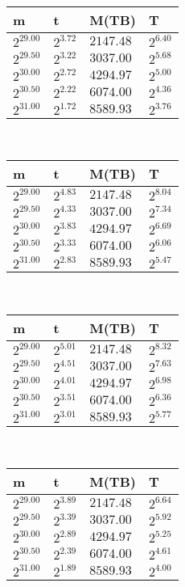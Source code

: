  \ 
\begin{tabular}{llll}
m & t & M(TB) & T \\ \hline
$2^{29.00}$ & $2^{3.72}$ & $2147.48$ & $2^{6.40}$ \\
$2^{29.50}$ & $2^{3.22}$ & $3037.00$ & $2^{5.68}$ \\
$2^{30.00}$ & $2^{2.72}$ & $4294.97$ & $2^{5.00}$ \\
$2^{30.50}$ & $2^{2.22}$ & $6074.00$ & $2^{4.36}$ \\
$2^{31.00}$ & $2^{1.72}$ & $8589.93$ & $2^{3.76}$ \\
\end{tabular}
 \ 
\begin{tabular}{llll}
m & t & M(TB) & T \\ \hline
$2^{29.00}$ & $2^{4.83}$ & $2147.48$ & $2^{8.04}$ \\
$2^{29.50}$ & $2^{4.33}$ & $3037.00$ & $2^{7.34}$ \\
$2^{30.00}$ & $2^{3.83}$ & $4294.97$ & $2^{6.69}$ \\
$2^{30.50}$ & $2^{3.33}$ & $6074.00$ & $2^{6.06}$ \\
$2^{31.00}$ & $2^{2.83}$ & $8589.93$ & $2^{5.47}$ \\
\end{tabular}
 \ 
\begin{tabular}{llll}
m & t & M(TB) & T \\ \hline
$2^{29.00}$ & $2^{5.01}$ & $2147.48$ & $2^{8.32}$ \\
$2^{29.50}$ & $2^{4.51}$ & $3037.00$ & $2^{7.63}$ \\
$2^{30.00}$ & $2^{4.01}$ & $4294.97$ & $2^{6.98}$ \\
$2^{30.50}$ & $2^{3.51}$ & $6074.00$ & $2^{6.36}$ \\
$2^{31.00}$ & $2^{3.01}$ & $8589.93$ & $2^{5.77}$ \\
\end{tabular}
 \ 
\begin{tabular}{llll}
m & t & M(TB) & T \\ \hline
$2^{29.00}$ & $2^{3.89}$ & $2147.48$ & $2^{6.64}$ \\
$2^{29.50}$ & $2^{3.39}$ & $3037.00$ & $2^{5.92}$ \\
$2^{30.00}$ & $2^{2.89}$ & $4294.97$ & $2^{5.25}$ \\
$2^{30.50}$ & $2^{2.39}$ & $6074.00$ & $2^{4.61}$ \\
$2^{31.00}$ & $2^{1.89}$ & $8589.93$ & $2^{4.00}$ \\
\end{tabular}
